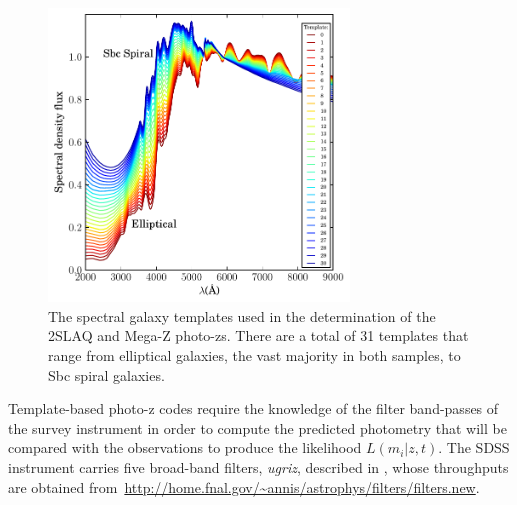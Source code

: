 \begin{figure}
\centering
\includegraphics[type=pdf,ext=.pdf,read=.pdf, width=80mm]{./plots/2slaq_templates}
\caption{The spectral galaxy templates used in the determination of the 2SLAQ and Mega-Z photo-zs. There are a total of 31 templates that range from elliptical galaxies, the vast majority in both samples, to Sbc spiral galaxies.}
\label{2slaq_templates}
\end{figure}
Template-based photo-z codes require the knowledge of the filter band-passes of the survey instrument in order to compute the predicted photometry that will be compared with the observations to produce the likelihood $L(m_i|z,t)$. The SDSS instrument carries five broad-band filters, \textit{ugriz}, described in \citet{Fukugita1996}, whose throughputs are obtained from~\url{http://home.fnal.gov/~annis/astrophys/filters/filters.new}.

